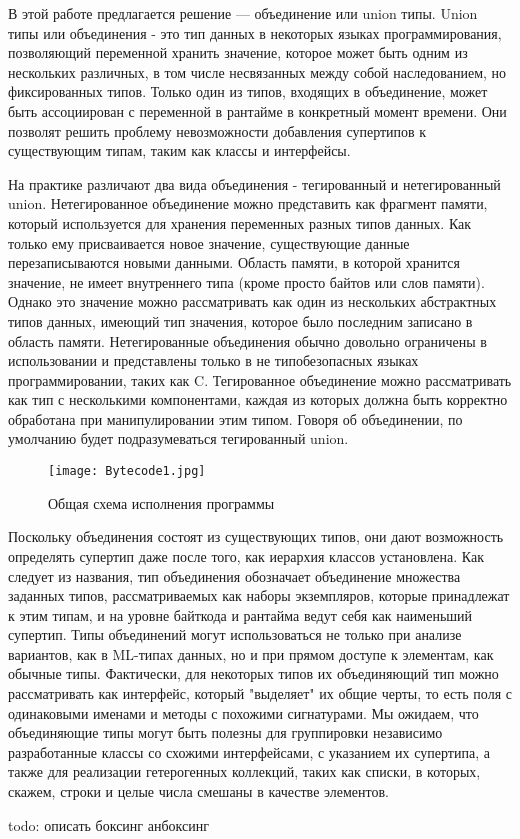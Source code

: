 В этой работе предлагается решение — объединение или union типы.
Union типы или объединения - это тип данных в некоторых языках программирования, позволяющий
переменной хранить значение, которое может быть одним из нескольких различных, в том числе
несвязанных между собой наследованием, но фиксированных типов.
Только один из типов, входящих в объединение, может быть ассоциирован с переменной в рантайме в
конкретный момент времени.
Они позволят решить проблему невозможности добавления супертипов к существующим типам, таким как классы и интерфейсы.

На практике различают два вида объединения - тегированный и нетегированный union.
Нетегированное объединение можно представить как фрагмент памяти, который используется для хранения переменных разных
типов данных.
Как только ему присваивается новое значение, существующие данные перезаписываются новыми данными.
Область памяти, в которой хранится значение, не имеет внутреннего типа (кроме просто байтов или слов памяти).
Однако это значение можно рассматривать как один из нескольких абстрактных типов данных, имеющий тип значения,
которое было последним записано в область памяти.
Нетегированные объединения обычно довольно ограничены в использовании и представлены только в не типобезопасных языках
программировании, таких как C\@.
Тегированное объединение можно рассматривать как тип с несколькими компонентами, каждая из которых должна быть
корректно обработана при манипулировании этим типом.
Говоря об объединении, по умолчанию будет подразумеваться тегированный union.

\begin{figure}
    \centering
    \texttt{[image: Bytecode1.jpg]}
    \caption{Общая схема исполнения программы}\label{fig:figure}
\end{figure}

Поскольку объединения состоят из существующих типов, они дают возможность определять супертип даже после того,
как иерархия классов установлена.
Как следует из названия, тип объединения обозначает объединение множества заданных типов, рассматриваемых как наборы
экземпляров, которые принадлежат к этим типам, и на уровне байткода и рантайма ведут себя как наименьший супертип.
Типы объединений могут использоваться не только при анализе вариантов, как в ML-типах данных, но и при прямом доступе
к элементам, как обычные типы.
Фактически, для некоторых типов их объединяющий тип можно рассматривать как интерфейс,
который "выделяет" их общие черты, то есть поля с одинаковыми именами и методы с похожими сигнатурами.
Мы ожидаем, что объединяющие типы могут быть полезны для группировки независимо разработанные классы со схожими
интерфейсами, с указанием их супертипа, а также для реализации гетерогенных коллекций, таких как списки, в которых,
скажем, строки и целые числа смешаны в качестве элементов.


todo: описать боксинг анбоксинг

\newpage
